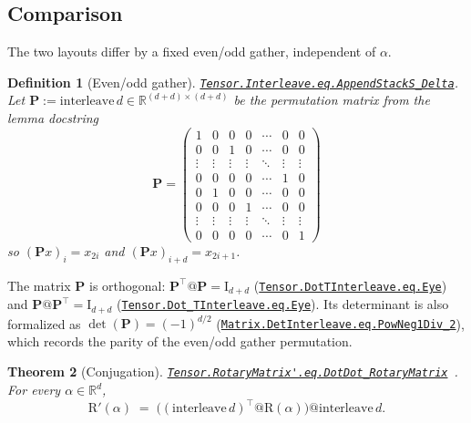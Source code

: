 \documentclass[11pt,a4paper]{article}
\newcommand{\lmod}[1]{\href{http://www.lemma.cn/lean/?module=#1}{\nolinkurl{#1}}}
\newtheorem{theorem}{Theorem}[section]
\newtheorem{definition}[theorem]{Definition}
\newcommand{\R}{\mathbb{R}}
\newcommand{\rot}{\mathrm{R}}
\newcommand{\eye}{\mathrm{I}}
\begin{document}
\subsection{Comparison}
\label{sec:compare}

The two layouts differ by a fixed even/odd gather, independent of \(\alpha\).

\begin{definition}[Even/odd gather]
\label{def:P}
\lmod{Tensor.Interleave.eq.AppendStackS_Delta}.
Let \(\boldsymbol{P}:=\mathrm{interleave}\,d\in\R^{(d+d)\times(d+d)}\) be the permutation matrix from the lemma docstring
\begin{equation}
\label{eq:P}
{\boldsymbol{P}}=\begin{pmatrix}
1 & 0 & 0 & 0 & \cdots & 0 & 0 \\
0 & 0 & 1 & 0 & \cdots & 0 & 0 \\
\vdots & \vdots & \vdots & \vdots & \ddots & \vdots & \vdots \\
0 & 0 & 0 & 0 & \cdots & 1 & 0 \\
0 & 1 & 0 & 0 & \cdots & 0 & 0 \\
0 & 0 & 0 & 1 & \cdots & 0 & 0 \\
\vdots & \vdots & \vdots & \vdots & \ddots & \vdots & \vdots \\
0 & 0 & 0 & 0 & \cdots & 0 & 1
\end{pmatrix}
\end{equation}
so \((\boldsymbol{P}x)_i=x_{2i}\) and \((\boldsymbol{P}x)_{i+d}=x_{2i+1}\).
\end{definition}

The matrix \(\boldsymbol{P}\) is orthogonal:
\(\boldsymbol{P}^\top@\boldsymbol{P}=\eye_{d+d}\)
(\lmod{Tensor.DotTInterleave.eq.Eye})
and
\(\boldsymbol{P}@\boldsymbol{P}^\top=\eye_{d+d}\)
(\lmod{Tensor.Dot_TInterleave.eq.Eye}).
Its determinant is also formalized as
\(\det(\boldsymbol{P})=(-1)^{d/2}\)
(\lmod{Matrix.DetInterleave.eq.PowNeg1Div_2}),
which records the parity of the even/odd gather permutation.

\begin{theorem}[Conjugation]
\label{thm:conj}
\lmod{Tensor.RotaryMatrix'.eq.DotDot_RotaryMatrix}~\cite{lemma_rope_conj}.
For every \(\alpha\in\R^d\),
\begin{equation}
  \label{eq:conj}
  \rot'(\alpha)
  \;=\;
  \bigl((\mathrm{interleave}\,d)^\top @ \rot(\alpha)\bigr) @ \mathrm{interleave}\,d.
\end{equation}
\end{theorem}
\end{document}
